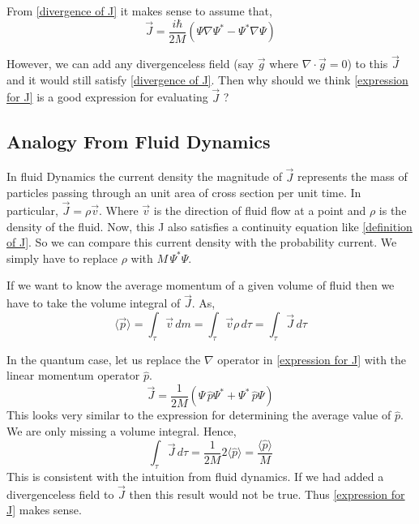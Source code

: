 \documentclass[a4paper, 12pt]{article}
\renewcommand{\indent}{\hspace{3ex}}
\begin{document}
From \eqref{divergence of J} it makes sense to assume that,
\begin{equation}
	\vec J = \frac{i \hbar}{2M} \left( \Psi \nabla\Psi^* - \Psi^* \nabla\Psi \right) \label{expression for J}
\end{equation}

However, we can add any divergenceless field (say $\vec g$ where $\nabla \cdot \vec g = 0$) to this $\vec J$ and it would still satisfy \eqref{divergence of J}. Then why should we think \eqref{expression for J} is a good expression for evaluating $\vec J$ ?

\subsection{Analogy From Fluid Dynamics}
\indent In fluid Dynamics the current density the magnitude of $\vec J$ represents the mass of particles passing through an unit area of cross section per unit time. In particular, $\vec J = \rho \vec v$. Where $\vec v$ is the direction of fluid flow at a point and $\rho$ is the density of the fluid. Now, this J also satisfies a continuity equation like \eqref{definition of J}. So we can compare this current density with the probability current. We simply have to replace $\rho$ with $ M \, \Psi^* \Psi$.

\indent If we want to know the average momentum of a given volume of fluid then we have to take the volume integral of $\vec J$. As,
\begin{equation}
	\langle \vec p \rangle = \int_\tau \vec v \, dm = \int_\tau \vec v \rho \, d\tau = \int_\tau \vec J \, d\tau \label{expression for average momentum}
\end{equation}

In the quantum case, let us replace the $\nabla$ operator in \eqref{expression for J} with the linear momentum operator $\hat p$.
\begin{equation}
	\vec J = \frac{1}{2M} \left( \Psi \, \hat p \Psi^* + \Psi^* \, \hat p \Psi \right) \label{J in terms of p}
\end{equation}
This looks very similar to the expression for determining the average value of $\hat p$. We are only missing a volume integral. Hence,
\begin{equation}
	\int_\tau \vec J \, d\tau = \frac{1}{2M} 2 \langle \hat p \rangle =  \frac{\langle \hat p \rangle} {M}
\end{equation}
This is consistent with the intuition from fluid dynamics. If we had added a divergenceless field to $\vec J$ then this result would not be true. Thus \eqref{expression for J} makes sense.
\end{document}
